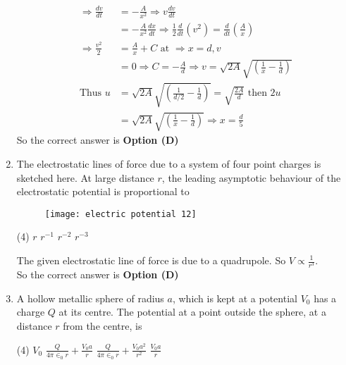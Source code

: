 \begin{enumerate}
\begin{answer}
\begin{align*}
		\Rightarrow \frac{d v}{d t}&=-\frac{A}{x^{2}} \Rightarrow v \frac{d v}{d t}\\&=-\frac{A}{x^{2}} \frac{d x}{d t} \Rightarrow \frac{1}{2} \frac{d}{d t}\left(v^{2}\right)=\frac{d}{d t}\left(\frac{A}{x}\right)\\
		\Rightarrow \frac{v^{2}}{2}&=\frac{A}{x}+C\text{ at }\Rightarrow x=d, v\\&=0 \Rightarrow C=-\frac{A}{d} \Rightarrow v=\sqrt{2 A} \sqrt{\left(\frac{1}{x}-\frac{1}{d}\right)}\\
		\text{Thus }u&=\sqrt{2 A} \sqrt{\left(\frac{1}{d / 2}-\frac{1}{d}\right)}=\sqrt{\frac{2 A}{d}}\text{ then }2 u\\&=\sqrt{2 A} \sqrt{\left(\frac{1}{x}-\frac{1}{d}\right)} \Rightarrow x=\frac{d}{5}
		\end{align*}
		So the correct answer is \textbf{Option (D)}
	\end{answer}
	\item  The electrostatic lines of force due to a system of four point charges is sketched here. At large distance $r$, the leading asymptotic behaviour of the electrostatic potential is proportional to
	{}
	\begin{figure}[H]
		\centering
		\texttt{[image: electric potential 12]}
	\end{figure}
	\begin{tasks}(4)
		\task[\textbf{A.}] $r$
		\task[\textbf{B.}] $r^{-1}$
		\task[\textbf{C.}] $r^{-2}$
		\task[\textbf{D.}] $r^{-3}$
	\end{tasks}
	\begin{answer}
		The given electrostatic line of force is due to a quadrupole. So $V \propto \frac{1}{r^{3}}$.\\
		So the correct answer is \textbf{Option (D)}
	\end{answer}
	\item A hollow metallic sphere of radius $a$, which is kept at a potential $V_{0}$ has a charge $Q$ at its centre. The potential at a point outside the sphere, at a distance $r$ from the centre, is
	{}
	\begin{tasks}(4)
		\task[\textbf{A.}] $V_{0}$
		\task[\textbf{B.}] $\frac{Q}{4 \pi \in_{0} r}+\frac{V_{0} a}{r}$
		\task[\textbf{C.}] $\frac{Q}{4 \pi \in_{0} r}+\frac{V_{0} a^{2}}{r^{2}}$
		\task[\textbf{D.}] $\frac{V_{0} a}{r}$
	\end{tasks}
	\begin{answer}
		\begin{align*}

\end{align*}
\end{answer}
\end{enumerate}
